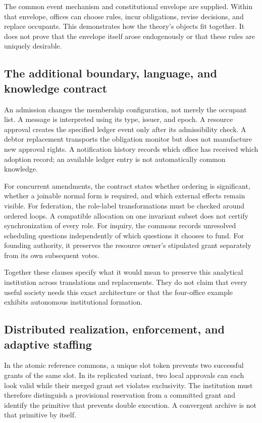 \documentclass[11pt,letterpaper]{article}
\theoremstyle{plain}
\theoremstyle{definition}
\theoremstyle{remark}
\begin{document}
The common event mechanism and constitutional envelope are supplied. Within that envelope, offices can choose rules, incur obligations, revise decisions, and replace occupants. This demonstrates how the theory's objects fit together. It does not prove that the envelope itself arose endogenously or that these rules are uniquely desirable.

\subsection{The additional boundary, language, and knowledge contract}
An admission changes the membership configuration, not merely the occupant list. A message is interpreted using its type, issuer, and epoch. A resource approval creates the specified ledger event only after its admissibility check. A debtor replacement transports the obligation monitor but does not manufacture new approval rights. A notification history records which office has received which adoption record; an available ledger entry is not automatically common knowledge.

For concurrent amendments, the contract states whether ordering is significant, whether a joinable normal form is required, and which external effects remain visible. For federation, the role-label transformations must be checked around ordered loops. A compatible allocation on one invariant subset does not certify synchronization of every role. For inquiry, the commons records unresolved scheduling questions independently of which questions it chooses to fund. For founding authority, it preserves the resource owner's stipulated grant separately from its own subsequent votes.

Together these clauses specify what it would mean to preserve this analytical institution across translations and replacements. They do not claim that every useful society needs this exact architecture or that the four-office example exhibits autonomous institutional formation.

\subsection{Distributed realization, enforcement, and adaptive staffing}
In the atomic reference commons, a unique slot token prevents two successful grants of the same slot. In its replicated variant, two local approvals can each look valid while their merged grant set violates exclusivity. The institution must therefore distinguish a provisional reservation from a committed grant and identify the primitive that prevents double execution. A convergent archive is not that primitive by itself.
\end{document}

